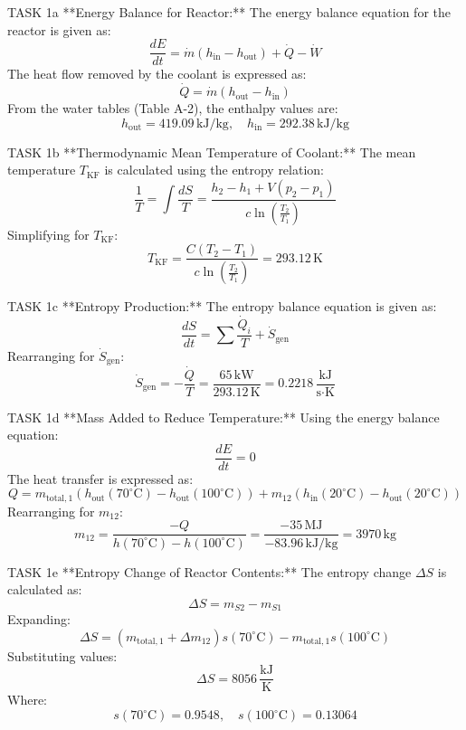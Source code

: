 TASK 1a  
**Energy Balance for Reactor:**  
The energy balance equation for the reactor is given as:  
\[
\frac{dE}{dt} = \dot{m} \left( h_{\text{in}} - h_{\text{out}} \right) + \dot{Q} - \dot{W}
\]  
The heat flow removed by the coolant is expressed as:  
\[
\dot{Q} = \dot{m} \left( h_{\text{out}} - h_{\text{in}} \right)
\]  
From the water tables (Table A-2), the enthalpy values are:  
\[
h_{\text{out}} = 419.09 \, \text{kJ/kg}, \quad h_{\text{in}} = 292.38 \, \text{kJ/kg}
\]  

TASK 1b  
**Thermodynamic Mean Temperature of Coolant:**  
The mean temperature \( T_{\text{KF}} \) is calculated using the entropy relation:  
\[
\frac{1}{T} = \int \frac{dS}{T} = \frac{h_2 - h_1 + V(p_2 - p_1)}{c \ln \left( \frac{T_2}{T_1} \right)}
\]  
Simplifying for \( T_{\text{KF}} \):  
\[
T_{\text{KF}} = \frac{C \left( T_2 - T_1 \right)}{c \ln \left( \frac{T_2}{T_1} \right)} = 293.12 \, \text{K}
\]  

TASK 1c  
**Entropy Production:**  
The entropy balance equation is given as:  
\[
\frac{dS}{dt} = \sum \frac{\dot{Q}_i}{T} + \dot{S}_{\text{gen}}
\]  
Rearranging for \( \dot{S}_{\text{gen}} \):  
\[
\dot{S}_{\text{gen}} = -\frac{\dot{Q}}{T} = \frac{65 \, \text{kW}}{293.12 \, \text{K}} = 0.2218 \, \frac{\text{kJ}}{\text{s·K}}
\]  

TASK 1d  
**Mass Added to Reduce Temperature:**  
Using the energy balance equation:  
\[
\frac{dE}{dt} = 0
\]  
The heat transfer is expressed as:  
\[
Q = m_{\text{total},1} \left( h_{\text{out}}(70^\circ\text{C}) - h_{\text{out}}(100^\circ\text{C}) \right) + m_{12} \left( h_{\text{in}}(20^\circ\text{C}) - h_{\text{out}}(20^\circ\text{C}) \right)
\]  
Rearranging for \( m_{12} \):  
\[
m_{12} = \frac{-Q}{h(70^\circ\text{C}) - h(100^\circ\text{C})} = \frac{-35 \, \text{MJ}}{-83.96 \, \text{kJ/kg}} = 3970 \, \text{kg}
\]  

TASK 1e  
**Entropy Change of Reactor Contents:**  
The entropy change \( \Delta S \) is calculated as:  
\[
\Delta S = m_{S2} - m_{S1}
\]  
Expanding:  
\[
\Delta S = \left( m_{\text{total},1} + \Delta m_{12} \right) s(70^\circ\text{C}) - m_{\text{total},1} s(100^\circ\text{C})
\]  
Substituting values:  
\[
\Delta S = 8056 \, \frac{\text{kJ}}{\text{K}}
\]  
Where:  
\[
s(70^\circ\text{C}) = 0.9548, \quad s(100^\circ\text{C}) = 0.13064
\]